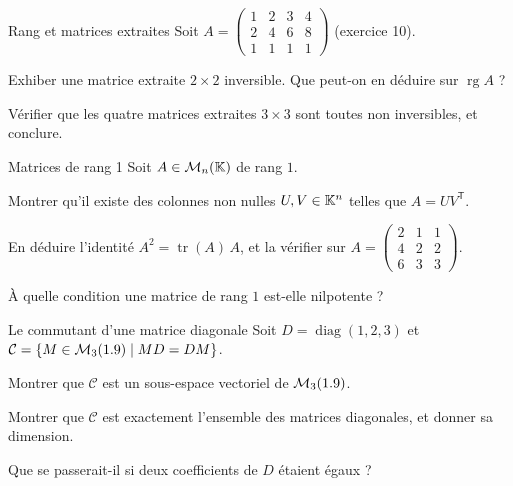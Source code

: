 \begin{exercice}[2]{Rang et matrices extraites}
Soit $A=\begin{pmatrix}1&2&3&4\\2&4&6&8\\1&1&1&1\end{pmatrix}$ (exercice 10).
\begin{questions}
  \item Exhiber une matrice extraite $2\times2$ inversible. Que peut-on en
    déduire sur $\operatorname{rg}A$ ?
  \item Vérifier que les quatre matrices extraites $3\times3$ sont toutes
    non inversibles, et conclure.
\end{questions}
\end{exercice}

\begin{exercice}[2]{Matrices de rang 1}
Soit $A\in\mathcal{M}_n(\mathbb{K})$ de rang $1$.
\begin{questions}
  \item Montrer qu'il existe des colonnes non nulles $U,V\in\mathbb{K}^{n}$ telles
    que $A=UV^{\mathsf T}$.
  \item En déduire l'identité $A^{2}=\operatorname{tr}(A)\,A$, et la
    vérifier sur $A=\begin{pmatrix}2&1&1\\4&2&2\\6&3&3\end{pmatrix}$.
  \item À quelle condition une matrice de rang $1$ est-elle nilpotente ?
\end{questions}
\end{exercice}


\begin{exercice}[3]{Le commutant d'une matrice diagonale}
Soit $D=\operatorname{diag}(1,2,3)$ et
$\mathcal{C}=\left\{M\in\mathcal{M}_3(1.9)\mid MD=DM\right\}$.
\begin{questions}
  \item Montrer que $\mathcal{C}$ est un sous-espace vectoriel de
    $\mathcal{M}_3(1.9)$.
  \item Montrer que $\mathcal{C}$ est exactement l'ensemble des matrices
    diagonales, et donner sa dimension.
  \item Que se passerait-il si deux coefficients de $D$ étaient égaux ?
\end{questions}
\end{exercice}

